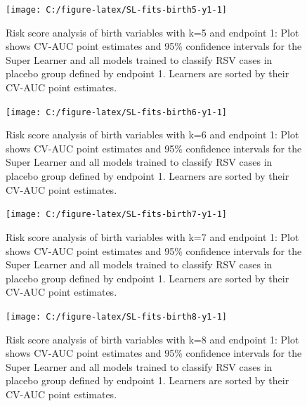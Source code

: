 \documentclass[11pt]{article}
\begin{document}
\begin{figure}[H]

{\centering \texttt{[image: C:/figure-latex/SL-fits-birth5-y1-1]} 

}

\caption[Risk score analysis of birth variables with k=5 and endpoint 1.]{Risk score analysis of birth variables with k=5 and endpoint 1: Plot shows CV-AUC point estimates and 95\% confidence intervals for the Super Learner and all models trained to classify RSV cases in placebo group defined by endpoint 1. Learners are sorted by their CV-AUC point estimates.}\label{fig:SL-fits-birth5-y1}
\end{figure}

\begin{figure}[H]

{\centering \texttt{[image: C:/figure-latex/SL-fits-birth6-y1-1]} 

}

\caption[Risk score analysis of birth variables with k=6 and endpoint 1.]{Risk score analysis of birth variables with k=6 and endpoint 1: Plot shows CV-AUC point estimates and 95\% confidence intervals for the Super Learner and all models trained to classify RSV cases in placebo group defined by endpoint 1. Learners are sorted by their CV-AUC point estimates.}\label{fig:SL-fits-birth6-y1}
\end{figure}

\begin{figure}[H]

{\centering \texttt{[image: C:/figure-latex/SL-fits-birth7-y1-1]} 

}

\caption[Risk score analysis of birth variables with k=7 and endpoint 1.]{Risk score analysis of birth variables with k=7 and endpoint 1: Plot shows CV-AUC point estimates and 95\% confidence intervals for the Super Learner and all models trained to classify RSV cases in placebo group defined by endpoint 1. Learners are sorted by their CV-AUC point estimates.}\label{fig:SL-fits-birth7-y1}
\end{figure}

\begin{figure}[H]

{\centering \texttt{[image: C:/figure-latex/SL-fits-birth8-y1-1]} 

}

\caption[Risk score analysis of birth variables with k=8 and endpoint 1.]{Risk score analysis of birth variables with k=8 and endpoint 1: Plot shows CV-AUC point estimates and 95\% confidence intervals for the Super Learner and all models trained to classify RSV cases in placebo group defined by endpoint 1. Learners are sorted by their CV-AUC point estimates.}\label{fig:SL-fits-birth8-y1}
\end{figure}
\end{document}
